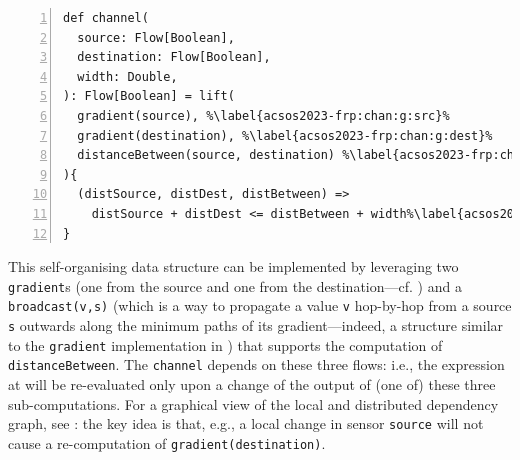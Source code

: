 \begin{example}
\begin{minipage}{\columnwidth}
\begin{lstlisting}[escapechar=\%,numbers=left,xleftmargin=0.3cm,numbersep=4pt]
def channel(
  source: Flow[Boolean],
  destination: Flow[Boolean],
  width: Double,
): Flow[Boolean] = lift(
  gradient(source), %\label{acsos2023-frp:chan:g:src}%
  gradient(destination), %\label{acsos2023-frp:chan:g:dest}%
  distanceBetween(source, destination) %\label{acsos2023-frp:chan:distbetw}%
){
  (distSource, distDest, distBetween) =>
    distSource + distDest <= distBetween + width%\label{acsos2023-frp:src:chan:expr}%
}
\end{lstlisting}
\end{minipage}
%
This self-organising data structure can be implemented by leveraging two \lstinline|gradient|s (one from the source and one from the destination---cf. )
 and a \lstinline|broadcast(v,s)| (which is a way to propagate a value \texttt{v} hop-by-hop from a source \texttt{s} outwards along the  minimum paths of its gradient---indeed,
a structure similar to the \lstinline|gradient| implementation in ) that supports the computation of \lstinline|distanceBetween|.
%
The \lstinline|channel| depends on these three flows: i.e.,
the expression at 
will be re-evaluated only upon a change of the output of (one of) these three sub-computations.
%
For a graphical view of the local and distributed dependency graph, see : the key idea is that, e.g., a local change in sensor \lstinline|source| will not cause a re-computation of \lstinline|gradient(destination)|.


\end{example}
